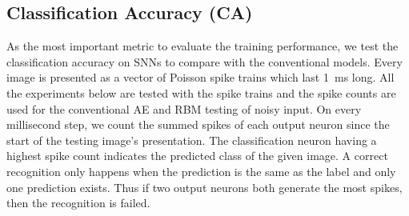 \subsection{Classification Accuracy (CA)}
As the most important metric to evaluate the training performance, we test the classification accuracy on SNNs to compare with the conventional models.
Every image is presented as a vector of Poisson spike trains which last 1~ms long.
All the experiments below are tested with the spike trains and the spike counts are used for the conventional AE and RBM testing of noisy input.
On every millisecond step, we count the summed spikes of each output neuron since the start of the testing image's presentation.
The classification neuron having a highest spike count indicates the predicted class of the given image.
A correct recognition only happens when the prediction is the same as the label and only one prediction exists.
Thus if two output neurons both generate the most spikes, then the recognition is failed.

